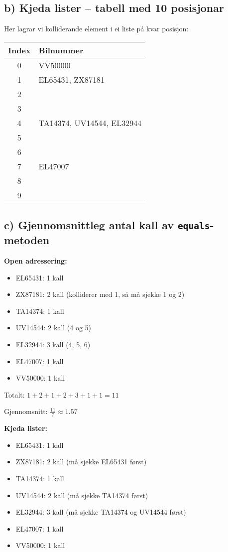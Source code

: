 \documentclass[12pt]{article}
\begin{document}
\subsection*{b) Kjeda lister – tabell med 10 posisjonar}

\noindent
Her lagrar vi kolliderande element i ei liste på kvar posisjon:

\begin{center}
\begin{tabular}{|c|l|}
\hline
Index & Bilnummer \\
\hline
0 & VV50000 \\
1 & EL65431, ZX87181 \\
2 & \\
3 & \\
4 & TA14374, UV14544, EL32944 \\
5 & \\
6 & \\
7 & EL47007 \\
8 & \\
9 & \\
\hline
\end{tabular}
\end{center}

\subsection*{c) Gjennomsnittleg antal kall av \texttt{equals}-metoden}

\noindent 
\textbf{Open adressering:}

\begin{itemize}
    \item EL65431: 1 kall
    \item ZX87181: 2 kall (kolliderer med 1, så må sjekke 1 og 2)
    \item TA14374: 1 kall
    \item UV14544: 2 kall (4 og 5)
    \item EL32944: 3 kall (4, 5, 6)
    \item EL47007: 1 kall
    \item VV50000: 1 kall
\end{itemize}

\noindent 
Totalt: $1 + 2 + 1 + 2 + 3 + 1 + 1 = 11$

\noindent
Gjennomsnitt: $\frac{11}{7} \approx 1.57$

\textbf{Kjeda lister:}

\begin{itemize}
    \item EL65431: 1 kall
    \item ZX87181: 2 kall (må sjekke EL65431 først)
    \item TA14374: 1 kall
    \item UV14544: 2 kall (må sjekke TA14374 først)
    \item EL32944: 3 kall (må sjekke TA14374 og UV14544 først)
    \item EL47007: 1 kall
    \item VV50000: 1 kall
\end{itemize}
\end{document}
